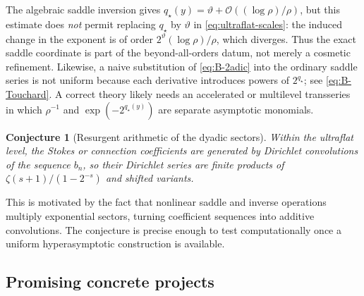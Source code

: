 \documentclass[11pt,oneside]{article}
\numberwithin{equation}{section}
\newtheorem{conjecture}[theorem]{Conjecture}
\theoremstyle{definition}
\theoremstyle{remark}
\newcommand{\bigO}{\mathcal O}
\newcommand{\phase}{\vartheta}
\begin{document}
The algebraic saddle inversion gives
$q_\star(y)=\phase+\bigO((\log\rho)/\rho)$, but this estimate does \emph{not}
permit replacing $q_\star$ by $\phase$ in \eqref{eq:ultraflat-scales}: the
induced change in the exponent is of order
$2^\phase(\log\rho)/\rho$, which diverges.  Thus the exact saddle coordinate is
part of the beyond-all-orders datum, not merely a cosmetic refinement.
Likewise, a naive substitution of \eqref{eq:B-2adic} into the ordinary saddle
series is not uniform because each derivative introduces powers of
$2^{q_\star}$; see \eqref{eq:B-Touchard}.  A correct theory likely needs an
accelerated or multilevel transseries in which $\rho^{-1}$ and
$\exp(-2^{q_\star(y)})$ are separate asymptotic monomials.

\begin{conjecture}[Resurgent arithmetic of the dyadic sectors]
\label{conj:resurgent-arithmetic}
Within the ultraflat level, the Stokes or connection coefficients are generated
by Dirichlet convolutions of the sequence $b_n$, so their Dirichlet series are
finite products of
\(
\zeta(s+1)/(1-2^{-s})
\)
and shifted variants.
\end{conjecture}

This is motivated by the fact that nonlinear saddle and inverse operations
multiply exponential sectors, turning coefficient sequences into additive
convolutions.  The conjecture is precise enough to test computationally once a
uniform hyperasymptotic construction is available.

\subsection{Promising concrete projects}
\end{document}
